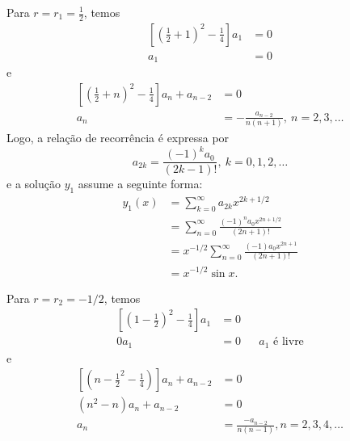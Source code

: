 \documentclass[a4paper,12pt, leqno, answers]{exam}
\begin{document}
\begin{questions}
\begin{solution}
        Para $r = r_1 = \frac{1}{2}$, temos
        \begin{align*}
            \left[ \left( \frac{1}{2} + 1 \right)^2 - \frac{1}{4} \right] a_1 &= 0 \\
            a_1 &= 0
        \end{align*}
        e
        \begin{align*}
            \left[ \left( \frac{1}{2} + n \right)^2 - \frac{1}{4} \right] a_n + a_{n - 2} &=0 \\
            a_n &= - \frac{a_{n - 2}}{n \left( n + 1 \right)}, \ n = 2, 3, \ldots
        \end{align*}
        Logo, a rela\c{c}\~{a}o de recorr\^{e}ncia \'{e} expressa por
        \[
        a_{2k} = \frac{\left( -1 \right)^k a_0}{\left( 2k - 1 \right)!}, \ k = 0, 1, 2, \ldots
        \]
        e a solu\c{c}\~{a}o $y_1$ assume a seguinte forma:
        \begin{align*}
            y_1\left( x \right) &= \sum_{k = 0}^\infty a_{2k} x^{2k + 1/2} \\
            &= \sum_{n = 0}^\infty \frac{\left( -1 \right)^n a_0 x^{2n + 1/2}}{\left( 2n + 1 \right)!} \\
            &= x^{-1/2} \sum_{n = 0}^\infty \frac{\left( -1 \right) a_0 x^{2n + 1}}{\left( 2 n + 1 \right)!} \\
            &= x^{-1/2} \sin x.
        \end{align*}

        Para $r = r_2 = -1/2$, temos
        \begin{align*}
            \left[ \left( 1 - \frac{1}{2} \right)^2 - \frac{1}{4} \right] a_1 &= 0 \\
            0a_1 &= 0 && a_1 \text{ \'{e} livre}
        \end{align*}
        e
        \begin{align*}
            \left[ \left( n - \frac{1}{2}^2 - \frac{1}{4} \right) \right] a_n + a_{n - 2} &= 0 \\
            \left( n^2 - n \right) a_n + a_{n - 2} &= 0 \\
            a_n &= \frac{-a_{n - 2}}{n (n - 1)}, n = 2, 3, 4, \ldots
        \end{align*}


\end{solution}
\end{questions}
\end{document}
